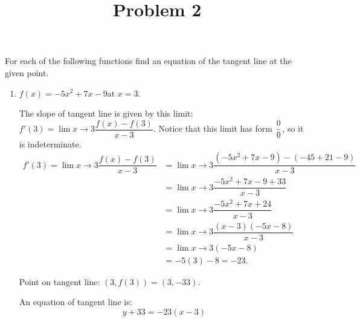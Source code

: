 \documentclass{ximera}
\title[Problem 2]{Problem 2}
\begin{document}
\begin{abstract} \end{abstract}
\maketitle


\begin{problem}
 For each of the following functions find an equation of the tangent line at the given point.
  \begin{enumerate}
    \item
      $f(x) = -5x^2 + 7x - 9$\quad at $x = 3$.
      \begin{explanation}
        The slope of tangent line is given by this limit: $f'(3) = \displaystyle \lim{x \to 3} \dfrac{f(x) -f(3)}{x-3}$. Notice that this limit has form $\dfrac{0}{0}$, so it is indeterminate. 
        \begin{align*}
          f'(3) = \displaystyle \lim{x \to 3} \dfrac{f(x) -f(3)}{x-3}
		&= \displaystyle \lim{x \to 3} \dfrac{(-5x^2 + 7x - 9) - (-45 + 21 - 9)}{x-3}  \\
		&= \displaystyle \lim{x \to 3} \dfrac{-5x^2 + 7x - 9 + 33}{x-3}  \\
		&= \displaystyle \lim{x \to 3} \dfrac{-5x^2 + 7x + 24}{x-3}  \\
		&= \displaystyle \lim{x \to 3} \dfrac{(x-3)(-5x -8)}{x-3}  \\
		&= \displaystyle \lim{x \to 3} (-5x - 8)  \\
		&= -5(3) - 8 = -23.
	\end{align*}
        
        Point on tangent line: $(3, f(3)) = (3, -33)$.

        An equation of tangent line is:
        \[ y + 33 = -23(x-3) \]
%	
      \end{explanation}


\end{enumerate}
\end{problem}
\end{document}
